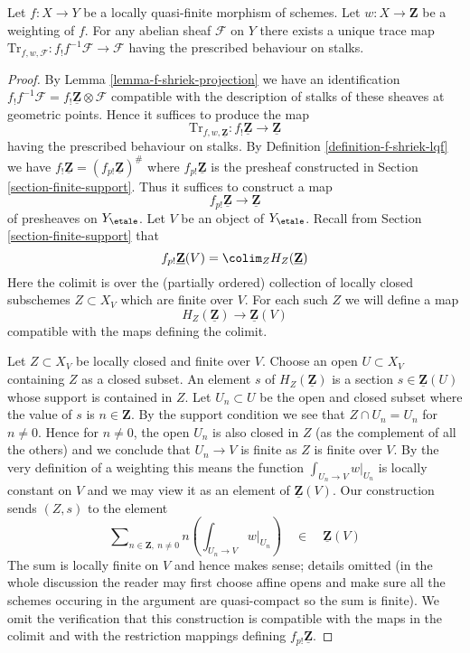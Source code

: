 \begin{lemma}
\label{lemma-trace-map-exists}
Let $f : X \to Y$ be a locally quasi-finite morphism of schemes.
Let $w : X \to \mathbf{Z}$ be a weighting of $f$. For any abelian sheaf
$\mathcal{F}$ on $Y$ there exists a unique trace map
$\text{Tr}_{f, w, \mathcal{F}} : f_!f^{-1}\mathcal{F} \to \mathcal{F}$
having the prescribed behaviour on stalks.
\end{lemma}

\begin{proof}
By Lemma \ref{lemma-f-shriek-projection} we have an identification
$f_!f^{-1}\mathcal{F} = f_!\underline{\mathbf{Z}} \otimes \mathcal{F}$
compatible with the description of stalks of these sheaves at
geometric points. Hence it suffices to produce the map
$$
\text{Tr}_{f, w, \underline{\mathbf{Z}}} :
f_!\underline{\mathbf{Z}}
\longrightarrow
\underline{\mathbf{Z}}
$$
having the prescribed behaviour on stalks. By
Definition \ref{definition-f-shriek-lqf} we have
$f_!\underline{\mathbf{Z}} = (f_{p!}\underline{\mathbf{Z}})^\#$
where $f_{p!}\underline{\mathbf{Z}}$ is the presheaf
constructed in Section \ref{section-finite-support}.
Thus it suffices to construct a map
$$
f_{p!}\underline{\mathbf{Z}} \longrightarrow \underline{\mathbf{Z}}
$$
of presheaves on $Y_\etale$. Let $V$ be an object of $Y_\etale$.
Recall from Section \ref{section-finite-support} that
$$
f_{p!}\underline{\mathbf{Z}}(V) = \colim_Z H_Z(\underline{\mathbf{Z}})
$$
Here the colimit is over the (partially ordered) collection of locally closed
subschemes $Z \subset X_V$ which are finite over $V$. For each such
$Z$ we will define a map
$$
H_Z(\underline{\mathbf{Z}}) \longrightarrow \underline{\mathbf{Z}}(V)
$$
compatible with the maps defining the colimit.

\medskip\noindent
Let $Z \subset X_V$ be locally closed and finite over $V$.
Choose an open $U \subset X_V$ containing $Z$ as a closed subset.
An element $s$ of $H_Z(\underline{\mathbf{Z}})$ is a section
$s \in \underline{\mathbf{Z}}(U)$ whose support is contained in $Z$.
Let $U_n \subset U$ be the open and closed subset where the value
of $s$ is $n \in \mathbf{Z}$. By the support condition we see that
$Z \cap U_n = U_n$ for $n \not = 0$. Hence for $n \not = 0$, the open
$U_n$ is also closed in $Z$ (as the complement of all the others)
and we conclude that $U_n \to V$ is finite as $Z$ is finite over $V$.
By the very definition of a weighting this means the
function $\int_{U_n \to V} w|_{U_n}$ is locally constant on $V$
and we may view it as an element of $\underline{\mathbf{Z}}(V)$.
Our construction sends $(Z, s)$ to the element
$$
\sum\nolimits_{n \in \mathbf{Z},\ n \not = 0}
n \left(\int_{U_n \to V} w|_{U_n}\right)
\quad \in \quad \underline{\mathbf{Z}}(V)
$$
The sum is locally finite on $V$ and hence makes sense; details omitted
(in the whole discussion the reader may first choose affine opens and
make sure all the schemes occuring in the argument are quasi-compact so
the sum is finite). We omit the verification that this construction
is compatible with the maps in the colimit and with the restriction
mappings defining $f_{p!}\underline{\mathbf{Z}}$.


\end{proof}
